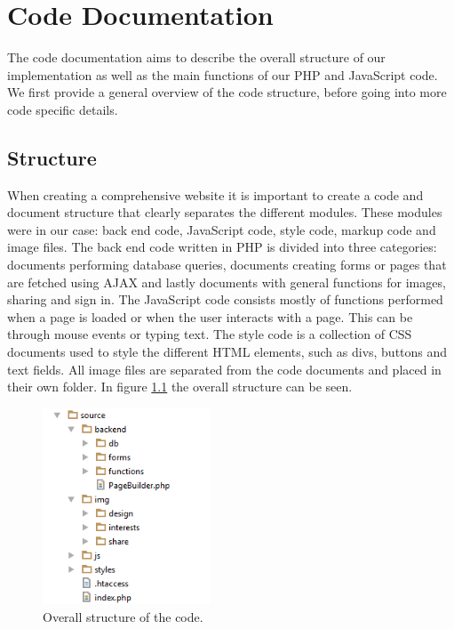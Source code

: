 \chapter{Code Documentation}
\label{apx:Code}

The code documentation aims to describe the overall structure of our implementation as well as the main functions of our PHP and JavaScript code. We first provide a general overview of the code structure, before going into more code specific details. 

\section{Structure}
\label{sec:CodeStructure}
When creating a comprehensive website it is important to create a code and document structure that clearly separates the different modules. These modules were in our case: back end code, JavaScript code, style code, markup code and image files. The back end code written in PHP is divided into three categories: documents performing database queries, documents creating forms or pages that are fetched using AJAX and lastly documents with general functions for images, sharing and sign in. The JavaScript code consists mostly of functions performed when a page is loaded or when the user interacts with a page. This can be through mouse events or typing text. The style code is a collection of CSS documents used to style the different HTML elements, such as divs, buttons and text fields. All image files are separated from the code documents and placed in their own folder. In figure \ref{fig:CodeStructureStruc} the overall structure can be seen.

\begin{figure}[ht!]
  \centering
  \includegraphics[width=50mm]{./Appendix/CodeDocumentation/img/structure}
  \caption{Overall structure of the code.}
  \label{fig:CodeStructureStruc}
\end{figure}

